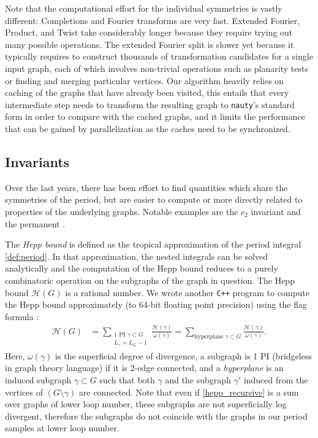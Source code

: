 \documentclass[12pt,a4paper]{article}
\renewcommand{\|}{\rule[-0.4ex]{0.2ex}{1.2em}}
\begin{document}
Note that the computational effort for the individual symmetries is vastly different: Completions  and Fourier transforms are very fast. Extended Fourier, Product, and Twist take considerably longer because they require trying out many possible operations. The extended Fourier split is slower yet because it typically requires to construct thousands of transformation candidates for a single input graph, each of which involves non-trivial operations such as planarity tests or finding and merging particular vertices. 
Our algorithm heavily relies on caching of the graphs that have already been visited, this entails that every intermediate step needs to transform the resulting graph to \texttt{nauty}'s standard form in order to compare with the cached graphs, and it limits the performance that can be gained by parallelization as the caches need to be synchronized.


\subsection{Invariants}\label{sec:invariants}
Over the last years, there has been effort to find quantities which share the symmetries of the period, but are easier to compute or more directly related to properties of the underlying graphs. Notable examples are the $c_2$  invariant \cite{schnetz_quantum_2011,hu_further_2022} and the permanent \cite{crump_period_2016,crump_properties_2017}.


The \emph{Hepp bound} \cite{panzer_hepp_2022} is defined as the tropical approximation of the period integral \cref{def:period}. In that approximation, the nested integrals can be solved analytically and the computation of the Hepp bound reduces to a purely combinatoric operation on the subgraphs of the graph in question. The Hepp bound $\mathcal H(G)$ is a rational number. We wrote another \texttt{C++} program to compute the Hepp bound approximately (to 64-bit floating point precision) using the flag formula \cite{panzer_hepp_2022}:
\begin{align}\label{hepp_recursive}
	\mathcal H(G) &= \sum_{\substack{\text{1 PI }\gamma \subset G \\ L_\gamma= L_G-1}} \frac{\mathcal H(\gamma)}{\omega(\gamma)}= \sum_{ \text{hyperplane }\gamma \subset G } \frac{\mathcal H (\gamma)}{\omega(\gamma)}.
\end{align}
Here, $\omega(\gamma)$ is the superficial degree of divergence, a subgraph is 1 PI (bridgeless in graph theory language) if it is 2-edge connected, and a \emph{hyperplane} is an induced subgraph $\gamma \subset G$ such that both $\gamma$ and the subgraph $\gamma'$ induced from the vertices of $(G \setminus \gamma)$ are connected. Note that even if \cref{hepp_recursive} is a sum over graphs of lower loop number, these subgraphs are not superficially log divergent, therefore the subgraphs do not coincide with the graphs in our period samples at lower loop number.
\end{document}
